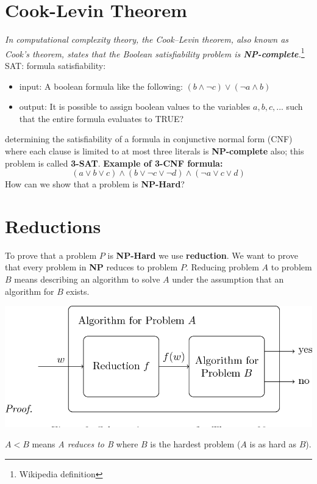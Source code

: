 \section{Cook-Levin Theorem}
\textit{In computational complexity theory, the Cook–Levin theorem, also known as Cook's theorem, states that the Boolean satisfiability problem is \textbf{NP-complete}.}\footnote{Wikipedia definition}\newline\newline
SAT: formula satisfiability:
\begin{itemize}
    \item input: A boolean formula like the following: $(b \land \neg c) \lor (\neg a \land b)$

    \item output: It is possible to assign boolean values to the variables $a, b, c, ...$ such that the entire formula evaluates to TRUE?
\end{itemize}
determining the satisfiability of a formula in conjunctive normal form (CNF) where each clause is limited to at most three literals is \textbf{NP-complete} also; this problem is called \textbf{3-SAT}.\newline\newline
\textbf{Example of 3-CNF formula:}
\[(a \lor b \lor c) \land (b \lor \neg c \lor \neg d) \land (\neg a \lor c \lor d)\]
How can we show that a problem is \textbf{NP-Hard}?

\section{Reductions}

To prove that a problem $P$ is \textbf{NP-Hard} we use \textbf{reduction}. We want to prove that every problem in \textbf{NP} reduces to problem $P$.\newline\newline
Reducing problem $A$ to problem $B$ means describing an algorithm to solve $A$ under the assumption that an algorithm for $B$ exists.
\begin{center}
    \includegraphics[scale=0.4]{images/Reduction.png}
\end{center}
$A < B$ means \textit{A reduces to B} where $B$ is the hardest problem ($A$ is as hard as $B$).


